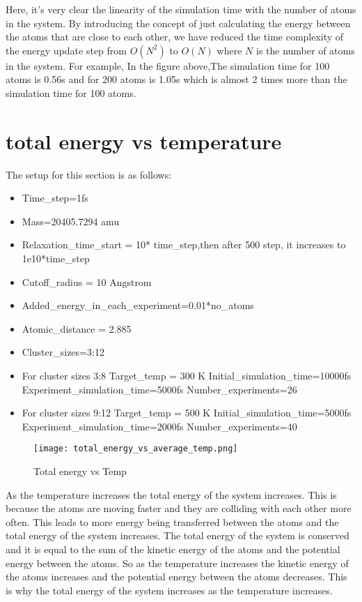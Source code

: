     Here, it's very clear the linearity of the simulation time with the number of atoms in the system. By introducing the concept of just calculating the energy between the atoms that are close to each other, we have reduced the time complexity of the energy update step from $O(N^2)$ to $O(N)$ where $N$ is the number of atoms in the system. For example, In the figure above,The  simulation time for 100 atoms is 0.56s and for 200 atoms is 1.05s which is almost 2 times more than the simulation time for 100 atoms.

\section{total energy vs temperature}
The setup for this section is as follows:
    \begin{itemize}
        \item Time\_step=1fs
        \item Mass=20405.7294 amu
        \item Relaxation\_time\_start = 10* time\_step,then after 500 step, it increases to 1e10*time\_step
        \item Cutoff\_radius = 10 Angstrom
        \item Added\_energy\_in\_each\_experiment=0.01*no\_atoms
        \item Atomic\_distance = 2.885
        \item Cluster\_sizes=3:12
        \item For cluster sizes 3:8 
        \subitem  Target\_temp = 300 K
        \subitem  Initial\_simulation\_time=10000fs
        \subitem  Experiment\_simulation\_time=5000fs
        \subitem  Number\_experiments=26
        \item For cluster sizes 9:12 
        \subitem  Target\_temp = 500 K
        \subitem  Initial\_simulation\_time=5000fs
        \subitem  Experiment\_simulation\_time=2000fs
        \subitem  Number\_experiments=40
    \end{itemize}
    \graphicspath{ {./figures/milestone07/} }
    \begin{figure}[!htb]
    \centering
        \texttt{[image: total\_energy\_vs\_average\_temp.png]}
        \caption{Total energy vs Temp}
    \label{fig:simulation_time_vs_atoms_number}
    \end{figure}
    As the temperature increases the total energy of the system increases. This is because the atoms are moving faster and they are colliding with each other more often. This leads to more energy being transferred between the atoms and the total energy of the system increases. The total energy of the system is conserved and it is equal to the sum of the kinetic energy of the atoms and the potential energy between the atoms. So as the temperature increases the kinetic energy of the atoms increases and the potential energy between the atoms decreases. This is why the total energy of the system increases as the temperature increases.  

